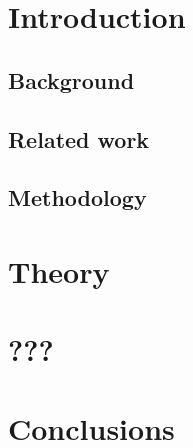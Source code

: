 \documentclass[paper=A4,DIV=calc]{scrbook}
\theoremstyle{plain}
\theoremstyle{definition}
\begin{document}
	\frontmatter
	\makefrontmatter

	\cleardoublepage
	\tableofcontents
	
	\mainmatter
	\chapter{Introduction}
	\section{Background}
	\section{Related work}
	\section{Methodology}

	\chapter{Theory}
	
	
	

	\chapter{???}

	\chapter{Conclusions}

	\nocite{*}
	\printbibliography[heading=bibintoc]
	\printglossary[type=\acronymtype,]
	\backmatter
\end{document}
